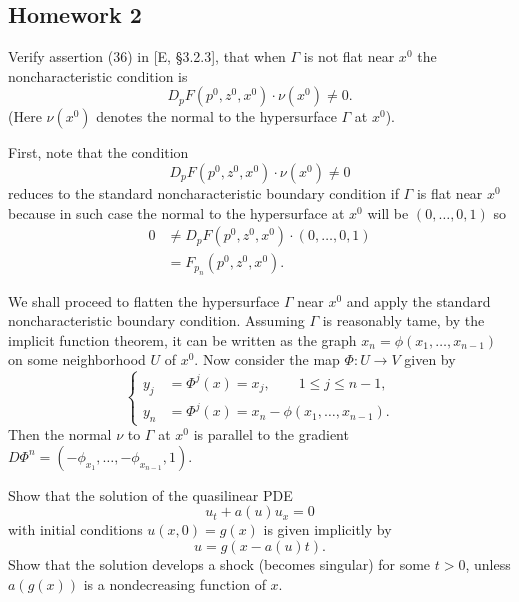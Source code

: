 \subsection{Homework 2}
\begin{problem}
  Verify assertion (36) in [E, \S 3.2.3], that when \(\Gamma\) is not flat
  near \(x^0\) the noncharacteristic condition is
  \[
    D_pF(p^0,z^0,x^0)\cdot \nu(x^0)\neq 0.
  \]
  (Here \(\nu(x^0)\) denotes the normal to the hypersurface \(\Gamma\) at
  \(x^0\)).
\end{problem}
\begin{solution*}
  First, note that the condition
  \[
    D_pF(p^0,z^0,x^0)\cdot \nu(x^0)\neq 0
  \]
  reduces to the standard noncharacteristic boundary condition if
  \(\Gamma\) is flat near \(x^0\) because in such case the normal to the
  hypersurface at \(x^0\) will be \((0,\dotsc,0,1)\) so
  \begin{align*}
    0&\neq D_pF(p^0,z^0,x^0)\cdot (0,\dotsc,0,1)\\
     &=F_{p_n}(p^0,z^0,x^0).
  \end{align*}

  We shall proceed to flatten the hypersurface \(\Gamma\) near \(x^0\) and
  apply the standard noncharacteristic boundary condition. Assuming
  \(\Gamma\) is reasonably tame, by the implicit function theorem, it can
  be written as the graph \(x_n=\phi(x_1,\dotsc,x_{n-1})\) on some
  neighborhood \(U\) of \(x^0\). Now consider the map \(\Phi\colon U\to V\)
  given by
  \[
    \left\{
      \begin{aligned}
        y_j&=\Phi^j(x)=x_j,\qquad 1\leq j\leq n-1,\\
        y_n&=\Phi^j(x)=x_n-\phi(x_1,\dotsc,x_{n-1}).
      \end{aligned}
    \right.
  \]
  Then the normal \(\nu\) to \(\Gamma\) at \(x^0\) is parallel to the
  gradient \(D\Phi^n=(-\phi_{x_1},\dotsc,-\phi_{x_{n-1}},1)\).
\end{solution*}

\begin{problem}
  Show that the solution of the quasilinear PDE
  \[
    u_t+a(u)u_x=0
  \]
  with initial conditions \(u(x,0)=g(x)\) is given implicitly by
  \[
    u=g(x-a(u)t).
  \]
  Show that the solution develops a shock (becomes singular) for some
  \(t>0\), unless \(a(g(x))\) is a nondecreasing function of
  \(x\).
\end{problem}
\begin{solution*}
\end{solution*}

